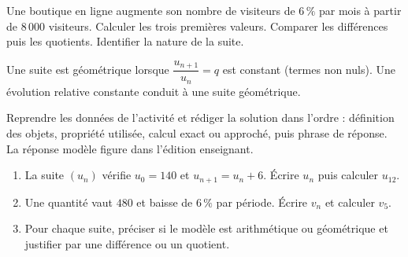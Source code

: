     \begin{activite}
    Une boutique en ligne augmente son nombre de visiteurs de $6\,\%$ par mois à partir de $8\,000$ visiteurs. Calculer les trois premières valeurs. Comparer les différences puis les quotients. Identifier la nature de la suite.
    \begin{center}\end{center}
    \end{activite}

    \begin{traceecrite}Une suite est géométrique lorsque $\dfrac{u_{n+1}}{u_n}=q$ est constant (termes non nuls). Une évolution relative constante conduit à une suite géométrique.\end{traceecrite}

    \begin{exemple}
    Reprendre les données de l'activité et rédiger la solution dans l'ordre : définition des objets, propriété utilisée, calcul exact ou approché, puis phrase de réponse. La réponse modèle figure dans l'édition enseignant.
    \end{exemple}

    \begin{exercice}[-- essentiel]
    \begin{enumerate}\item La suite $(u_n)$ vérifie $u_0=140$ et $u_{n+1}=u_n+6$. Écrire $u_n$ puis calculer $u_{12}$.\item Une quantité vaut $480$ et baisse de $6\,\%$ par période. Écrire $v_n$ et calculer $v_5$.\item Pour chaque suite, préciser si le modèle est arithmétique ou géométrique et justifier par une différence ou un quotient.\end{enumerate}
    \end{exercice}

